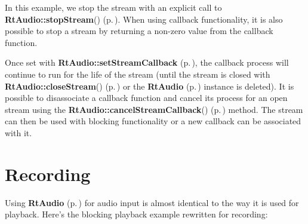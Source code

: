 In this example, we stop the stream with an explicit call to {\bf Rt\-Audio::stop\-Stream}() {\rm (p.\,\pageref{classRtAudio_a12})}. When using callback functionality, it is also possible to stop a stream by returning a non-zero value from the callback function.

Once set with {\bf Rt\-Audio::set\-Stream\-Callback} {\rm (p.\,\pageref{classRtAudio_a4})}, the callback process will continue to run for the life of the stream (until the stream is closed with {\bf Rt\-Audio::close\-Stream}() {\rm (p.\,\pageref{classRtAudio_a10})} or the {\bf Rt\-Audio} {\rm (p.\,\pageref{classRtAudio})} instance is deleted). It is possible to disassociate a callback function and cancel its process for an open stream using the {\bf Rt\-Audio::cancel\-Stream\-Callback}() {\rm (p.\,\pageref{classRtAudio_a5})} method. The stream can then be used with blocking functionality or a new callback can be associated with it.

\section{Recording}\label{recording}


Using {\bf Rt\-Audio} {\rm (p.\,\pageref{classRtAudio})} for audio input is almost identical to the way it is used for playback. Here's the blocking playback example rewritten for recording:

